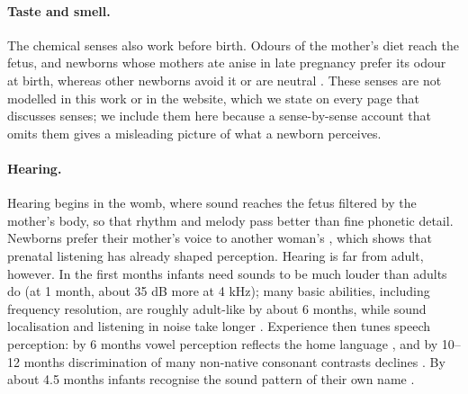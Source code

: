 \documentclass{article}
\begin{document}
\paragraph{Taste and smell.} The chemical senses also work before birth. Odours of the mother's diet reach the fetus, and newborns whose mothers ate anise in late pregnancy prefer its odour at birth, whereas other newborns avoid it or are neutral \autocite{schaal2000human}. These senses are not modelled in this work or in the website, which we state on every page that discusses senses; we include them here because a sense-by-sense account that omits them gives a misleading picture of what a newborn perceives.

\paragraph{Hearing.} Hearing begins in the womb, where sound reaches the fetus filtered by the mother's body, so that rhythm and melody pass better than fine phonetic detail. Newborns prefer their mother's voice to another woman's \autocite{decasper1980human}, which shows that prenatal listening has already shaped perception. Hearing is far from adult, however. In the first months infants need sounds to be much louder than adults do (at 1 month, about 35 dB more at 4 kHz); many basic abilities, including frequency resolution, are roughly adult-like by about 6 months, while sound localisation and listening in noise take longer \autocite{werner2007issues}. Experience then tunes speech perception: by 6 months vowel perception reflects the home language \autocite{kuhl1992linguistic}, and by 10--12 months discrimination of many non-native consonant contrasts declines \autocite{werker1984cross}. By about 4.5 months infants recognise the sound pattern of their own name \autocite{mandel1995infants}.
\end{document}
